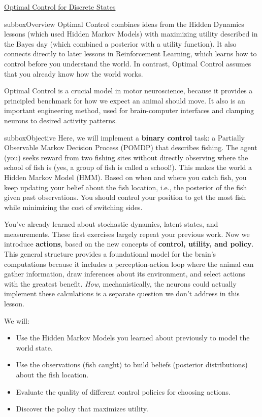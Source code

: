 \begin{textbox}{\href{https://compneuro.neuromatch.io/tutorials/W3D3_OptimalControl/student/W3D3_Tutorial1.html}{Optimal Control for Discrete States }   }
\begin{subbox}{subbox}{Overview}
\scriptsize
Optimal Control combines ideas from the Hidden Dynamics lessons (which used Hidden Markov Models) with maximizing utility described in the Bayes day (which combined a posterior with a utility function). It also connects directly to later lessons in Reinforcement Learning, which learns how to control before you understand the world. In contrast, Optimal Control assumes that you already know how the world works.

Optimal Control is a crucial model in motor neuroscience, because it provides a principled benchmark for how we expect an animal should move. It also is an important engineering method, used for brain-computer interfaces and clamping neurons to desired activity patterns.

\end{subbox}

\begin{subbox}{subbox}{Objective}
\scriptsize
Here, we will implement a \textbf{binary control} task: a Partially Observable Markov Decision Process (POMDP) that describes fishing. The agent (you) seeks reward from two fishing sites without directly observing where the school of fish is (yes, a group of fish is called a school!). This makes the world a Hidden Markov Model (HMM). Based on when and where you catch fish, you keep updating your belief about the fish location, i.e., the posterior of the fish given past observations. You should control your position to get the most fish while minimizing the cost of switching sides.

You've already learned about stochastic dynamics, latent states, and measurements. These first exercises largely repeat your previous work. Now we introduce \textbf{actions}, based on the new concepts of \textbf{control, utility, and policy}. This general structure provides a foundational model for the brain's computations because it includes a perception-action loop where the animal can gather information, draw inferences about its environment, and select actions with the greatest benefit. \textit{How}, mechanistically, the neurons could actually implement these calculations is a separate question we don't address in this lesson.

We will:
\begin{itemize}
    \item 
 Use the Hidden Markov Models you learned about previously to model the world state.
    \item  Use the observations (fish caught) to build beliefs (posterior distributions) about the fish location.
    \item  Evaluate the quality of different control policies for choosing actions.
    \item  Discover the policy that maximizes utility.
\end{itemize}

\end{subbox}
\end{textbox}
